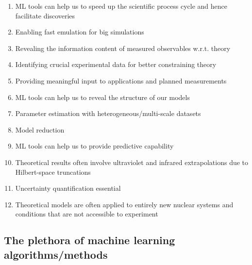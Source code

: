 \documentclass[%
oneside,                 %
final,                   %
10pt]{article}
\begin{document}
\begin{enumerate}
\item ML tools can help us to speed up the scientific process cycle and hence facilitate discoveries

\item Enabling fast emulation for big simulations

\item Revealing the information content of measured observables w.r.t. theory

\item Identifying crucial experimental data for better constraining theory

\item Providing meaningful input to applications and planned measurements

\item ML tools can help us to reveal the structure of our models

\item Parameter estimation with heterogeneous/multi-scale datasets

\item Model reduction

\item ML tools can help us to provide predictive capability

\item Theoretical results often involve ultraviolet  and infrared extrapolations due to Hilbert-space truncations 

\item Uncertainty quantification essential

\item Theoretical models are often applied to entirely new nuclear systems and conditions that are not accessible to experiment
\end{enumerate}

\noindent
\subsection{The plethora  of machine learning algorithms/methods}
\end{document}
